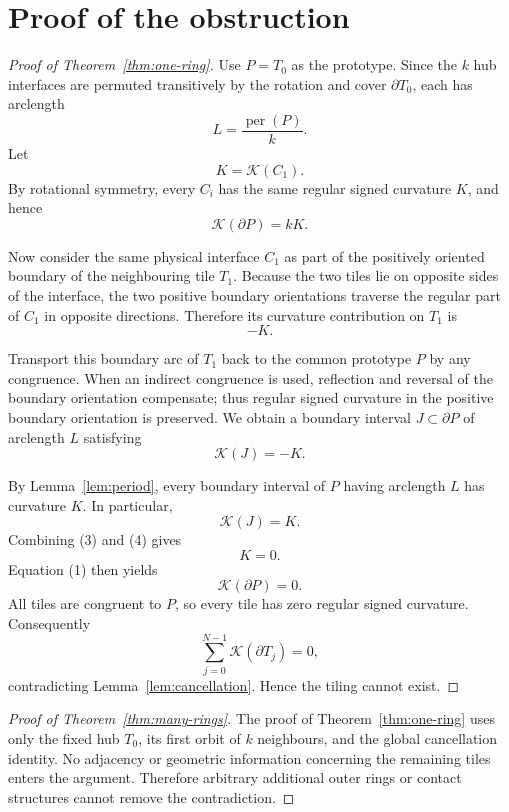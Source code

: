 \documentclass[11pt]{article}
\theoremstyle{definition}
\theoremstyle{remark}
\newcommand{\T}{T}
\newcommand{\Kreg}{\mathcal K}
\begin{document}
\section{Proof of the obstruction}

\begin{proof}[Proof of Theorem~\ref{thm:one-ring}]
Use $P=\T_0$ as the prototype.  Since the $k$ hub interfaces are permuted transitively by the rotation and cover $\partial\T_0$, each has arclength
\[
  L=\frac{\operatorname{per}(P)}{k}.
\]
Let
\[
  K=\Kreg(C_1).
\]
By rotational symmetry, every $C_i$ has the same regular signed curvature $K$, and hence
\[
  \Kreg(\partial P)=kK. \tag{1}
\]

Now consider the same physical interface $C_1$ as part of the positively oriented boundary of the neighbouring tile $\T_1$.  Because the two tiles lie on opposite sides of the interface, the two positive boundary orientations traverse the regular part of $C_1$ in opposite directions.  Therefore its curvature contribution on $\T_1$ is
\[
  -K. \tag{2}
\]

Transport this boundary arc of $\T_1$ back to the common prototype $P$ by any congruence.  When an indirect congruence is used, reflection and reversal of the boundary orientation compensate; thus regular signed curvature in the positive boundary orientation is preserved.  We obtain a boundary interval $J\subset\partial P$ of arclength $L$ satisfying
\[
  \Kreg(J)=-K. \tag{3}
\]

By Lemma~\ref{lem:period}, every boundary interval of $P$ having arclength $L$ has curvature $K$.  In particular,
\[
  \Kreg(J)=K. \tag{4}
\]
Combining (3) and (4) gives
\[
  K=0.
\]
Equation (1) then yields
\[
  \Kreg(\partial P)=0.
\]
All tiles are congruent to $P$, so every tile has zero regular signed curvature.  Consequently
\[
  \sum_{j=0}^{N-1}\Kreg(\partial\T_j)=0,
\]
contradicting Lemma~\ref{lem:cancellation}.  Hence the tiling cannot exist.
\end{proof}

\begin{proof}[Proof of Theorem~\ref{thm:many-rings}]
The proof of Theorem~\ref{thm:one-ring} uses only the fixed hub $\T_0$, its first orbit of $k$ neighbours, and the global cancellation identity.  No adjacency or geometric information concerning the remaining tiles enters the argument.  Therefore arbitrary additional outer rings or contact structures cannot remove the contradiction.
\end{proof}
\end{document}
